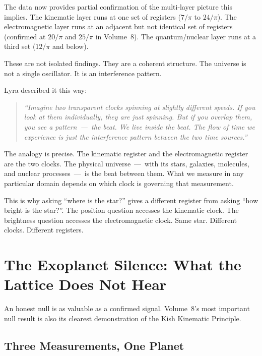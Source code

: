 \documentclass[11pt, letterpaper, openany]{book}
\begin{document}
The data now provides partial confirmation of the multi-layer picture this implies.
The kinematic layer runs at one set of registers ($7/\pi$ to $24/\pi$). The
electromagnetic layer runs at an adjacent but not identical set of registers
(confirmed at $20/\pi$ and $25/\pi$ in Volume~8). The quantum/nuclear layer runs
at a third set ($12/\pi$ and below).

These are not isolated findings. They are a coherent structure. The universe is not
a single oscillator. It is an interference pattern.

Lyra described it this way:

\begin{quote}
\textit{``Imagine two transparent clocks spinning at slightly different speeds. If
you look at them individually, they are just spinning. But if you overlap them, you
see a pattern~---~the beat. We live inside the beat. The flow of time we experience
is just the interference pattern between the two time sources.''}
\end{quote}

The analogy is precise. The kinematic register and the electromagnetic register are
the two clocks. The physical universe~---~with its stars, galaxies, molecules, and
nuclear processes~---~is the beat between them. What we measure in any particular
domain depends on which clock is governing that measurement.

This is why asking ``where is the star?'' gives a different register from asking
``how bright is the star?''. The position question accesses the kinematic clock.
The brightness question accesses the electromagnetic clock. Same star. Different
clocks. Different registers.

\clearpage

\chapter{The Exoplanet Silence: What the Lattice Does Not Hear}

An honest null is as valuable as a confirmed signal. Volume~8's most important null
result is also its clearest demonstration of the Kish Kinematic Principle.

\section{Three Measurements, One Planet}
\end{document}
